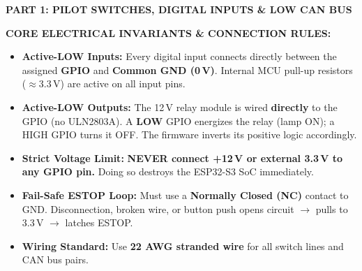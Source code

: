 \documentclass[11pt,a4paper]{article}
\begin{document}
\normalsize


\begin{center}
  {\large\bfseries PART 1: PILOT SWITCHES, DIGITAL INPUTS \& LOW CAN BUS}
\end{center}
\vspace{-8pt}

\begin{tcolorbox}[bwalert]
\textbf{CORE ELECTRICAL INVARIANTS \& CONNECTION RULES:}
\begin{itemize}[leftmargin=1.3em, itemsep=1pt, topsep=1pt, parsep=0pt]
  \item \textbf{Active-LOW Inputs:} Every digital input connects directly between the assigned \textbf{GPIO} and \textbf{Common GND (0\,V)}. Internal MCU pull-up resistors ($\approx$3.3\,V) are active on all input pins.
  \item \textbf{Active-LOW Outputs:} The 12\,V relay module is wired \textbf{directly} to the GPIO (no ULN2803A). A \textbf{LOW} GPIO energizes the relay (lamp ON); a HIGH GPIO turns it OFF. The firmware inverts its positive logic accordingly.
  \item \textbf{Strict Voltage Limit:} \textbf{NEVER connect +12\,V or external 3.3\,V to any GPIO pin.} Doing so destroys the ESP32-S3 SoC immediately.
  \item \textbf{Fail-Safe ESTOP Loop:} Must use a \textbf{Normally Closed (NC)} contact to GND. Disconnection, broken wire, or button push opens circuit $\rightarrow$ pulls to 3.3\,V $\rightarrow$ latches ESTOP.
  \item \textbf{Wiring Standard:} Use \textbf{22 AWG stranded wire} for all switch lines and CAN bus pairs.
\end{itemize}
\end{tcolorbox}

\vspace{-5pt}
\end{document}
